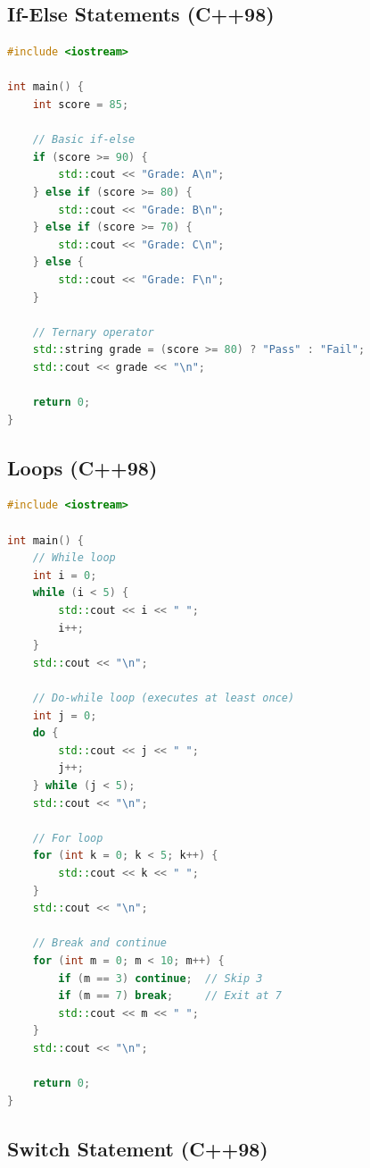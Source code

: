 \hypertarget{if-else-statements-c98}{%
\subsection{If-Else Statements (C++98)}\label{if-else-statements-c98}}

\begin{lstlisting}[language={C++}]
#include <iostream>

int main() {
    int score = 85;
    
    // Basic if-else
    if (score >= 90) {
        std::cout << "Grade: A\n";
    } else if (score >= 80) {
        std::cout << "Grade: B\n";
    } else if (score >= 70) {
        std::cout << "Grade: C\n";
    } else {
        std::cout << "Grade: F\n";
    }
    
    // Ternary operator
    std::string grade = (score >= 80) ? "Pass" : "Fail";
    std::cout << grade << "\n";
    
    return 0;
}
\end{lstlisting}

\hypertarget{loops-c98}{%
\subsection{Loops (C++98)}\label{loops-c98}}

\begin{lstlisting}[language={C++}]
#include <iostream>

int main() {
    // While loop
    int i = 0;
    while (i < 5) {
        std::cout << i << " ";
        i++;
    }
    std::cout << "\n";
    
    // Do-while loop (executes at least once)
    int j = 0;
    do {
        std::cout << j << " ";
        j++;
    } while (j < 5);
    std::cout << "\n";
    
    // For loop
    for (int k = 0; k < 5; k++) {
        std::cout << k << " ";
    }
    std::cout << "\n";
    
    // Break and continue
    for (int m = 0; m < 10; m++) {
        if (m == 3) continue;  // Skip 3
        if (m == 7) break;     // Exit at 7
        std::cout << m << " ";
    }
    std::cout << "\n";
    
    return 0;
}
\end{lstlisting}

\hypertarget{switch-statement-c98}{%
\subsection{Switch Statement (C++98)}\label{switch-statement-c98}}


